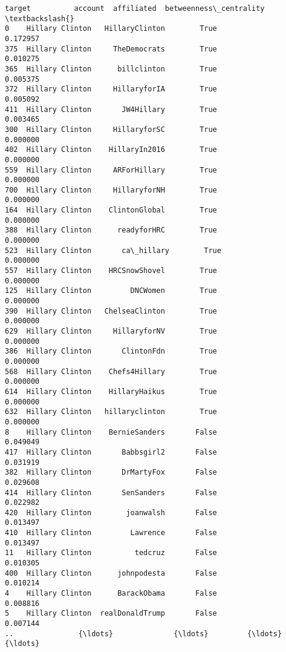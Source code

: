 \documentclass[11pt]{article}
\begin{document}
    \begin{Verbatim}[commandchars=\\\{\}]
              target          account  affiliated  betweenness\_centrality  \textbackslash{}
0    Hillary Clinton   HillaryClinton        True                0.172957   
375  Hillary Clinton     TheDemocrats        True                0.010275   
365  Hillary Clinton      billclinton        True                0.005375   
372  Hillary Clinton     HillaryforIA        True                0.005092   
411  Hillary Clinton       JW4Hillary        True                0.003465   
300  Hillary Clinton     HillaryforSC        True                0.000000   
402  Hillary Clinton    HillaryIn2016        True                0.000000   
559  Hillary Clinton     ARForHillary        True                0.000000   
700  Hillary Clinton     HillaryforNH        True                0.000000   
164  Hillary Clinton    ClintonGlobal        True                0.000000   
388  Hillary Clinton      readyforHRC        True                0.000000   
523  Hillary Clinton       ca\_hillary        True                0.000000   
557  Hillary Clinton    HRCSnowShovel        True                0.000000   
125  Hillary Clinton         DNCWomen        True                0.000000   
390  Hillary Clinton   ChelseaClinton        True                0.000000   
629  Hillary Clinton     HillaryforNV        True                0.000000   
386  Hillary Clinton       ClintonFdn        True                0.000000   
568  Hillary Clinton    Chefs4Hillary        True                0.000000   
614  Hillary Clinton    HillaryHaikus        True                0.000000   
632  Hillary Clinton   hillaryclinton        True                0.000000   
8    Hillary Clinton    BernieSanders       False                0.049049   
417  Hillary Clinton       Babbsgirl2       False                0.031919   
382  Hillary Clinton       DrMartyFox       False                0.029608   
414  Hillary Clinton       SenSanders       False                0.022982   
420  Hillary Clinton        joanwalsh       False                0.013497   
410  Hillary Clinton         Lawrence       False                0.013497   
11   Hillary Clinton          tedcruz       False                0.010305   
400  Hillary Clinton      johnpodesta       False                0.010214   
4    Hillary Clinton      BarackObama       False                0.008816   
5    Hillary Clinton  realDonaldTrump       False                0.007144   
..               {\ldots}              {\ldots}         {\ldots}                     {\ldots}   

\end{Verbatim}
\end{document}
